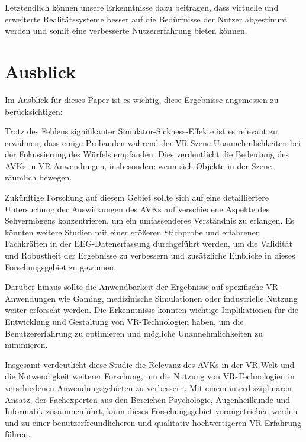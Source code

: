 \documentclass[conference]{IEEEtran}
\begin{document}
Letztendlich können unsere Erkenntnisse dazu beitragen, dass virtuelle und erweiterte Realitätssysteme besser auf die Bedürfnisse der Nutzer abgestimmt werden und somit eine verbesserte Nutzererfahrung bieten können.
\section{Ausblick}

Im Ausblick für dieses Paper ist es wichtig, diese Ergebnisse angemessen zu berücksichtigen:

Trotz des Fehlens signifikanter Simulator-Sickness-Effekte ist es relevant zu erwähnen, dass einige Probanden während der VR-Szene Unannehmlichkeiten bei der Fokussierung des Würfels empfanden. Dies verdeutlicht die Bedeutung des AVKs in VR-Anwendungen, insbesondere wenn sich Objekte in der Szene räumlich bewegen.

Zukünftige Forschung auf diesem Gebiet sollte sich auf eine detailliertere Untersuchung der Auswirkungen des AVKs auf verschiedene Aspekte des Sehvermögens konzentrieren, um ein umfassenderes Verständnis zu erlangen. Es könnten weitere Studien mit einer größeren Stichprobe und erfahrenen Fachkräften in der EEG-Datenerfassung durchgeführt werden, um die Validität und Robustheit der Ergebnisse zu verbessern und zusätzliche Einblicke in dieses Forschungsgebiet zu gewinnen.

Darüber hinaus sollte die Anwendbarkeit der Ergebnisse auf spezifische VR-Anwendungen wie Gaming, medizinische Simulationen oder industrielle Nutzung weiter erforscht werden. Die Erkenntnisse könnten wichtige Implikationen für die Entwicklung und Gestaltung von VR-Technologien haben, um die Benutzererfahrung zu optimieren und mögliche Unannehmlichkeiten zu minimieren.

Insgesamt verdeutlicht diese Studie die Relevanz des AVKs in der VR-Welt und die Notwendigkeit weiterer Forschung, um die Nutzung von VR-Technologien in verschiedenen Anwendungsgebieten zu verbessern. Mit einem interdisziplinären Ansatz, der Fachexperten aus den Bereichen Psychologie, Augenheilkunde und Informatik zusammenführt, kann dieses Forschungsgebiet vorangetrieben werden und zu einer benutzerfreundlicheren und qualitativ hochwertigeren VR-Erfahrung führen.

\newpage
\end{document}
